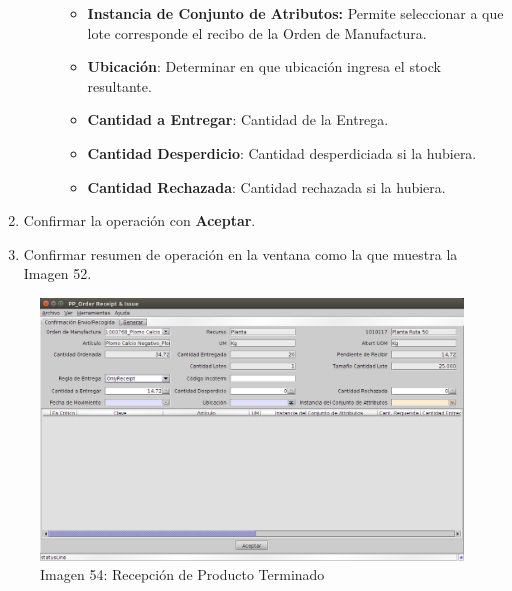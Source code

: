 \documentclass[letterpaper,10pt,spanish]{sphinxmanual}
\begin{document}
\begin{enumerate}
\begin{description}
\begin{itemize}
\item {} 
\textbf{Instancia de Conjunto de Atributos:} Permite seleccionar a que lote corresponde el recibo de la Orden de Manufactura.

\item {} 
\textbf{Ubicación}: Determinar en que ubicación ingresa el stock resultante.

\item {} 
\textbf{Cantidad a Entregar}: Cantidad de la Entrega.

\item {} 
\textbf{Cantidad Desperdicio}: Cantidad desperdiciada si la hubiera.

\item {} 
\textbf{Cantidad Rechazada}: Cantidad rechazada si la hubiera.

\end{itemize}

\end{description}

\item {} 
Confirmar la operación con \textbf{Aceptar}.

\item {} 
Confirmar resumen de operación en la ventana como la que muestra la Imagen 52.

\end{enumerate}
\begin{figure}[htbp]
\centering
\capstart

\includegraphics{ly_recepcion.png}
\caption{Imagen 54: Recepción de Producto Terminado}\end{figure}
\end{document}
